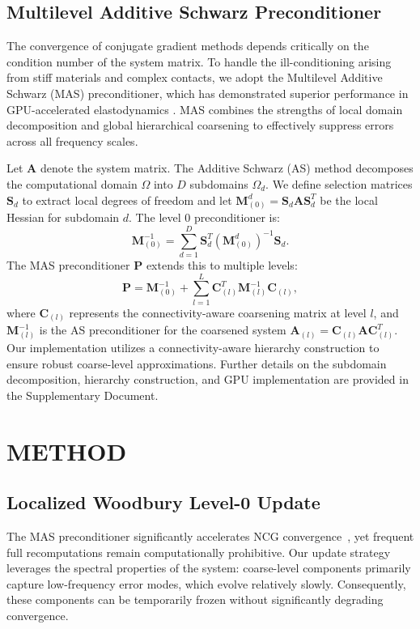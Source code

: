 \documentclass[acmtog,anonymous,review,screen,nonacm]{acmart}
\begin{document}
\subsection{Multilevel Additive Schwarz Preconditioner}
The convergence of conjugate gradient methods depends critically on the condition number of the system matrix. To handle the ill-conditioning arising from stiff materials and complex contacts, we adopt the Multilevel Additive Schwarz (MAS) preconditioner, which has demonstrated superior performance in GPU-accelerated elastodynamics \cite{wu2022gpu, huang2025stiffgipc}. MAS combines the strengths of local domain decomposition and global hierarchical coarsening to effectively suppress errors across all frequency scales.

Let $\mathbf{A}$ denote the system matrix. The Additive Schwarz (AS) method decomposes the computational domain $\Omega$ into $D$ subdomains $\Omega_d$. We define selection matrices $\mathbf{S}_d$ to extract local degrees of freedom and let $\mathbf{M}_{(0)}^d = \mathbf{S}_d \mathbf{A} \mathbf{S}_d^T$ be the local Hessian for subdomain $d$. The level 0 preconditioner is:
\begin{equation}
    \mathbf{M}_{(0)}^{-1} = \sum_{d=1}^D \mathbf{S}_d^T (\mathbf{M}_{(0)}^d)^{-1} \mathbf{S}_d.
\end{equation}
The MAS preconditioner $\mathbf{P}$ extends this to multiple levels:
\begin{equation}
    \mathbf{P} = \mathbf{M}_{(0)}^{-1} + \sum_{l=1}^L \mathbf{C}_{(l)}^T \mathbf{M}_{(l)}^{-1} \mathbf{C}_{(l)},
\end{equation}
where $\mathbf{C}_{(l)}$ represents the connectivity-aware coarsening matrix at level $l$, and $\mathbf{M}_{(l)}^{-1}$ is the AS preconditioner for the coarsened system $\mathbf{A}_{(l)} = \mathbf{C}_{(l)} \mathbf{A} \mathbf{C}_{(l)}^T$. Our implementation utilizes a connectivity-aware hierarchy construction to ensure robust coarse-level approximations. Further details on the subdomain decomposition, hierarchy construction, and GPU implementation are provided in the Supplementary Document.

\section{METHOD}
\subsection{Localized Woodbury Level-0 Update}
The MAS preconditioner significantly accelerates NCG convergence~\cite{wu2022gpu}, yet frequent full recomputations remain computationally prohibitive. Our update strategy leverages the spectral properties of the system: coarse-level components primarily capture low-frequency error modes, which evolve relatively slowly. Consequently, these components can be temporarily frozen without significantly degrading convergence.
\end{document}
